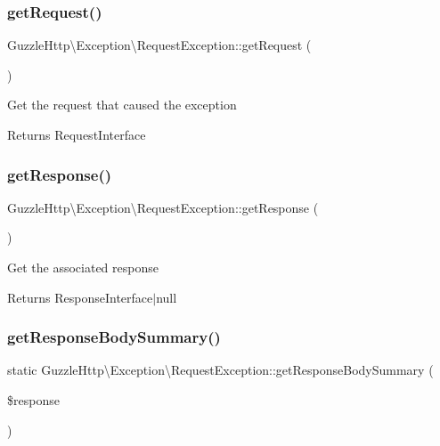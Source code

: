 \subsubsection{\texorpdfstring{get\+Request()}{getRequest()}}
{\footnotesize\ttfamily Guzzle\+Http\textbackslash{}\+Exception\textbackslash{}\+Request\+Exception\+::get\+Request (\begin{DoxyParamCaption}{ }\end{DoxyParamCaption})}

Get the request that caused the exception

\begin{DoxyReturn}{Returns}
Request\+Interface 
\end{DoxyReturn}
\mbox{\label{classGuzzleHttp_1_1Exception_1_1RequestException_acfda27bcc9617935534f76b320293846}} 
\subsubsection{\texorpdfstring{get\+Response()}{getResponse()}}
{\footnotesize\ttfamily Guzzle\+Http\textbackslash{}\+Exception\textbackslash{}\+Request\+Exception\+::get\+Response (\begin{DoxyParamCaption}{ }\end{DoxyParamCaption})}

Get the associated response

\begin{DoxyReturn}{Returns}
Response\+Interface$\vert$null 
\end{DoxyReturn}
\mbox{\label{classGuzzleHttp_1_1Exception_1_1RequestException_a6aa968b8fd113ceb2b67896ac08139ab}} 
\subsubsection{\texorpdfstring{get\+Response\+Body\+Summary()}{getResponseBodySummary()}}
{\footnotesize\ttfamily static Guzzle\+Http\textbackslash{}\+Exception\textbackslash{}\+Request\+Exception\+::get\+Response\+Body\+Summary (\begin{DoxyParamCaption}\item[{\hyperlink{interfacePsr_1_1Http_1_1Message_1_1ResponseInterface}{Response\+Interface}}]{\$response }\end{DoxyParamCaption})\hspace{0.3cm}{\ttfamily [static]}}

